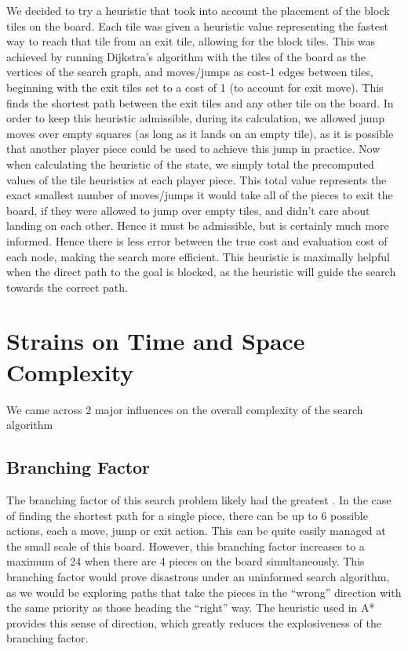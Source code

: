 \documentclass{article}[11pt]
\theoremstyle{plain}
\theoremstyle{definition}
\begin{document}
We decided to try a heuristic that took into account the placement of the block tiles on the board. Each tile was given a heuristic value representing the fastest way to reach that tile from an exit tile, allowing for the block tiles. This was achieved by running Dijkstra’s algorithm with the tiles of the board as the vertices of the search graph, and moves/jumps as cost-1 edges between tiles, beginning with the exit tiles set to a cost of 1 (to account for exit move). This finds the shortest path between the exit tiles and any other tile on the board. In order to keep this heuristic admissible, during its calculation, we allowed jump moves over empty squares (as long as it lands on an empty tile), as it is possible that another player piece could be used to achieve this jump in practice. Now when calculating the heuristic of the state, we simply total the precomputed values of the tile heuristics at each player piece. This total value represents the exact smallest number of moves/jumps it would take all of the pieces to exit the board, if they were allowed to jump over empty tiles, and didn't care about landing on each other. Hence it must be admissible, but is certainly much more informed. Hence there is less error between the true cost and evaluation cost of each node, making the search more efficient. This heuristic is maximally helpful when the direct path to the goal is blocked, as the heuristic will guide the search towards the correct path.

\section{Strains on Time and Space Complexity}

We came across 2 major influences on the overall complexity of the search algorithm

\subsection{Branching Factor}
The branching factor of this search problem likely had the greatest . In the case of finding the shortest path for a single piece, there can be up to 6 possible actions, each a move, jump or exit action. This can be quite easily managed at the small scale of this board. However, this branching factor increases to a maximum of 24 when there are 4 pieces on the board simultaneously. This branching factor would prove disastrous under an uninformed search algorithm, as we would be exploring paths that take the pieces in the ``wrong'' direction with the same priority as those heading the ``right'' way. The heuristic used in A* provides this sense of direction, which greatly reduces the explosiveness of the branching factor.
\end{document}
